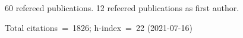 60 refereed publications. 12 refeered publications as first author.

Total citations~=~1826; h-index~=~22 (2021-07-16)
